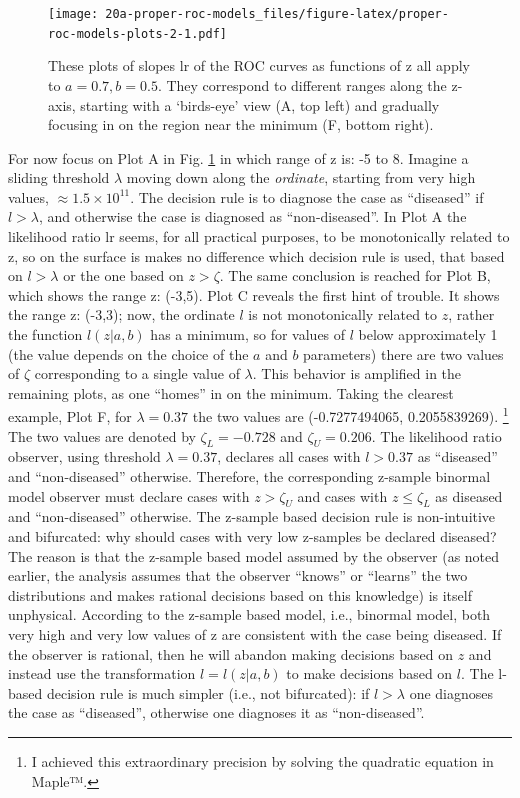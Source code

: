 \documentclass[
]{book}
\begin{document}
\begin{figure}
\centering
\texttt{[image: 20a-proper-roc-models\_files/figure-latex/proper-roc-models-plots-2-1.pdf]}
\caption{\label{fig:proper-roc-models-plots-2}These plots of slopes \(\text{lr}\) of the ROC curves as functions of z all apply to \(a = 0.7, b = 0.5\). They correspond to different ranges along the z-axis, starting with a `birds-eye' view (A, top left) and gradually focusing in on the region near the minimum (F, bottom right).}
\end{figure}

For now focus on Plot A in Fig. \ref{fig:proper-roc-models-plots-2} in which range of z is: -5 to 8. Imagine a sliding threshold \(\lambda\) moving down along the \emph{ordinate}, starting from very high values, \(\approx 1.5 \times 10^{11}\). The decision rule is to diagnose the case as ``diseased'' if \(l > \lambda\), and otherwise the case is diagnosed as ``non-diseased''. In Plot A the likelihood ratio \(\text{lr}\) seems, for all practical purposes, to be monotonically related to z, so on the surface is makes no difference which decision rule is used, that based on \(l > \lambda\) or the one based on \(z > \zeta\). The same conclusion is reached for Plot B, which shows the range z: (-3,5). Plot C reveals the first hint of trouble. It shows the range z: (-3,3); now, the ordinate \(l\) is not monotonically related to \(z\), rather the function \(l(z|a,b)\) has a minimum, so for values of \(l\) below approximately 1 (the value depends on the choice of the \(a\) and \(b\) parameters) there are two values of \(\zeta\) corresponding to a single value of \(\lambda\). This behavior is amplified in the remaining plots, as one ``homes'' in on the minimum. Taking the clearest example, Plot F, for \(\lambda = 0.37\) the two values are (-0.7277494065, 0.2055839269). \footnote{I achieved this extraordinary precision by solving the quadratic equation in Maple™.} The two values are denoted by \(\zeta_L=-0.728\) and \(\zeta_U=0.206\). The likelihood ratio observer, using threshold \(\lambda=0.37\), declares all cases with \(l > 0.37\) as ``diseased'' and ``non-diseased'' otherwise. Therefore, the corresponding z-sample binormal model observer must declare cases with \(z > \zeta_U\) and cases with \(z \le \zeta_L\) as diseased and ``non-diseased'' otherwise. The z-sample based decision rule is non-intuitive and bifurcated: why should cases with very low z-samples be declared diseased? The reason is that the z-sample based model assumed by the observer (as noted earlier, the analysis assumes that the observer ``knows'' or ``learns'' the two distributions and makes rational decisions based on this knowledge) is itself unphysical. According to the z-sample based model, i.e., binormal model, both very high and very low values of z are consistent with the case being diseased. If the observer is rational, then he will abandon making decisions based on \(z\) and instead use the transformation \(l=l(z|a,b)\) to make decisions based on \(l\). The l-based decision rule is much simpler (i.e., not bifurcated): if \(l > \lambda\) one diagnoses the case as ``diseased'', otherwise one diagnoses it as ``non-diseased''.
\end{document}

